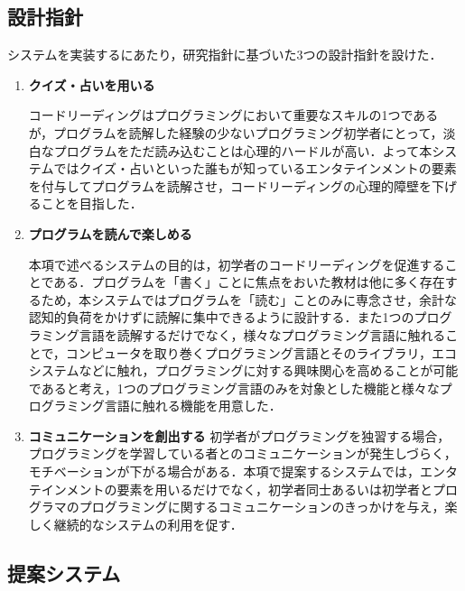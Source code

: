 \subsection{設計指針}
システムを実装するにあたり，研究指針に基づいた3つの設計指針を設けた．
\begin{enumerate}
  \item {\bf クイズ・占いを用いる}

  コードリーディングはプログラミングにおいて重要なスキルの1つであるが，プログラムを読解した経験の少ないプログラミング初学者にとって，淡白なプログラムをただ読み込むことは心理的ハードルが高い．よって本システムではクイズ・占いといった誰もが知っているエンタテインメントの要素を付与してプログラムを読解させ，コードリーディングの心理的障壁を下げることを目指した．


  \item {\bf プログラムを読んで楽しめる}


  本項で述べるシステムの目的は，初学者のコードリーディングを促進することである．プログラムを「書く」ことに焦点をおいた教材は他に多く存在するため，本システムではプログラムを「読む」ことのみに専念させ，余計な認知的負荷をかけずに読解に集中できるように設計する．また1つのプログラミング言語を読解するだけでなく，様々なプログラミング言語に触れることで，コンピュータを取り巻くプログラミング言語とそのライブラリ，エコシステムなどに触れ，プログラミングに対する興味関心を高めることが可能であると考え，1つのプログラミング言語のみを対象とした機能と様々なプログラミング言語に触れる機能を用意した．


  \item {\bf コミュニケーションを創出する}
  初学者がプログラミングを独習する場合，プログラミングを学習している者とのコミュニケーションが発生しづらく，モチベーションが下がる場合がある．本項で提案するシステムでは，エンタテインメントの要素を用いるだけでなく，初学者同士あるいは初学者とプログラマのプログラミングに関するコミュニケーションのきっかけを与え，楽しく継続的なシステムの利用を促す．
\end{enumerate}

\subsection{提案システム}
